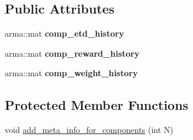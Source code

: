 \subsection*{Public Attributes}
\begin{DoxyCompactItemize}
\item 
arma\+::mat {\bfseries comp\+\_\+etd\+\_\+history}\hypertarget{classVIPS__Model_aae18271a9c94997444c4015ce24d666e}{}\label{classVIPS__Model_aae18271a9c94997444c4015ce24d666e}

\item 
arma\+::mat {\bfseries comp\+\_\+reward\+\_\+history}\hypertarget{classVIPS__Model_ad661b9d2f04bdc94a98e773144a8eb5d}{}\label{classVIPS__Model_ad661b9d2f04bdc94a98e773144a8eb5d}

\item 
arma\+::mat {\bfseries comp\+\_\+weight\+\_\+history}\hypertarget{classVIPS__Model_abbb57d44172beac50134b776f5308b0f}{}\label{classVIPS__Model_abbb57d44172beac50134b776f5308b0f}

\end{DoxyCompactItemize}
\subsection*{Protected Member Functions}
\begin{DoxyCompactItemize}
\item 
void \hyperlink{classVIPS__Model_ad175bd3a39cec843b674a9d937c01654}{add\+\_\+meta\+\_\+info\+\_\+for\+\_\+components} (int N)
\end{DoxyCompactItemize}
